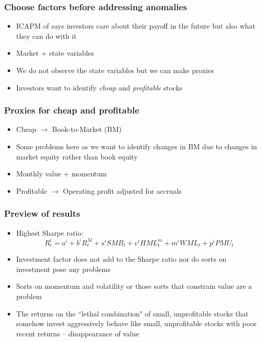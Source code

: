 \documentclass[notes]{beamer}  %
\begin{document}
\begin{frame}
  \frametitle{Choose factors before addressing anomalies}
  \begin{itemize}
    \item ICAPM of \textcite{merton1973intertemporal}
    says investors care about their payoff in the future but
    also what they can do with it
    \item Market + state variables
    \item We do not observe the state variables but we can make proxies
    \item Investors want to identify \emph{cheap} and \emph{profitable} stocks
    \parencite{graham1934security}
  \end{itemize}
\end{frame}

\begin{frame}
\frametitle{Proxies for cheap and profitable}
\begin{itemize}
    \item Cheap $\rightarrow$ Book-to-Market (BM)
    \parencite{fama1993common}
    \item Some problems here as we want to identify changes in BM due to
    changes in market equity rather than book equity
    \item Monthly value + momentum
    \parencite{asness2013devil, kok2017facts}
    \item Profitable $\rightarrow$ Operating profit adjusted for accruals
    \parencite{ball2016accruals}
\end{itemize}
\end{frame}

\begin{frame}
  \frametitle{Preview of results}
  \begin{itemize}
    \item Highest Sharpe ratio:
    \begin{equation}
      R_t^i=a^i + b^iR_t^M + s^iSMB_t + v^iHML_t^m + m^iWML_t + p^iPMU_t
    \end{equation}
    \item Investment factor does not add to the Sharpe ratio nor do sorts on
    investment pose any problems
    \item Sorts on momentum and volatility or those sorts that constrain value
    are a problem
    \item The returns on the ``lethal combination" \parencite{fama2015five,
    fama2016dissecting} of small, unprofitable stocks that somehow invest
    aggressively behave like small, unprofitable stocks with poor recent
    returns -- disappearance of value
  \end{itemize}
\end{frame}
\end{document}
